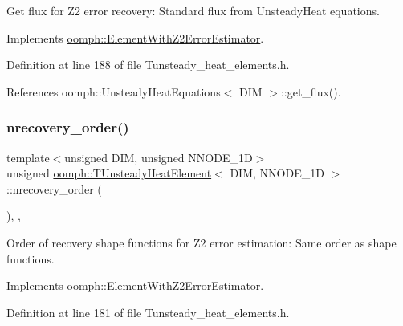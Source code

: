 Get \textquotesingle{}flux\textquotesingle{} for Z2 error recovery\+: Standard flux from Unsteady\+Heat equations. 



Implements \hyperlink{classoomph_1_1ElementWithZ2ErrorEstimator_a5688ff5f546d81771cabad82ca5a7556}{oomph\+::\+Element\+With\+Z2\+Error\+Estimator}.



Definition at line 188 of file Tunsteady\+\_\+heat\+\_\+elements.\+h.



References oomph\+::\+Unsteady\+Heat\+Equations$<$ D\+I\+M $>$\+::get\+\_\+flux().

\mbox{\label{classoomph_1_1TUnsteadyHeatElement_a5216b9570896508b5fd6063ca46223a5}} 
\subsubsection{\texorpdfstring{nrecovery\+\_\+order()}{nrecovery\_order()}}
{\footnotesize\ttfamily template$<$unsigned D\+IM, unsigned N\+N\+O\+D\+E\+\_\+1D$>$ \\
unsigned \hyperlink{classoomph_1_1TUnsteadyHeatElement}{oomph\+::\+T\+Unsteady\+Heat\+Element}$<$ D\+IM, N\+N\+O\+D\+E\+\_\+1D $>$\+::nrecovery\+\_\+order (\begin{DoxyParamCaption}{ }\end{DoxyParamCaption})\hspace{0.3cm}{\ttfamily [inline]}, {\ttfamily [protected]}, {\ttfamily [virtual]}}



Order of recovery shape functions for Z2 error estimation\+: Same order as shape functions. 



Implements \hyperlink{classoomph_1_1ElementWithZ2ErrorEstimator_af39480835bd3e0f6b2f4f7a9a4044798}{oomph\+::\+Element\+With\+Z2\+Error\+Estimator}.



Definition at line 181 of file Tunsteady\+\_\+heat\+\_\+elements.\+h.

\mbox{\label{classoomph_1_1TUnsteadyHeatElement_a864e7ce7dae3e1db65650970d890273d}} 

